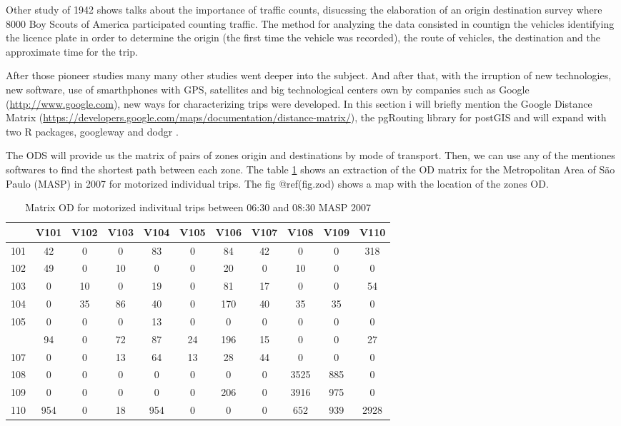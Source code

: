 \documentclass[12pt,graybox,envcountchap,sectrefs]{krantz}
\theoremstyle{definition}
\theoremstyle{definition}
\theoremstyle{definition}
\theoremstyle{remark}
\begin{document}
Other study of 1942 shows talks about the importance of traffic counts,
disucssing the elaboration of an origin destination survey where 8000
Boy Scouts of America participated counting traffic. The method for
analyzing the data consisted in countign the vehicles identifying the
licence plate in order to determine the origin (the first time the
vehicle was recorded), the route of vehicles, the destination and the
approximate time for the trip.

After those pioneer studies many many other studies went deeper into the
subject. And after that, with the irruption of new technologies, new
software, use of smarthphones with GPS, satellites and big technological
centers own by companies such as Google (\url{http://www.google.com}),
new ways for characterizing trips were developed. In this section i will
briefly mention the Google Distance Matrix
(\url{https://developers.google.com/maps/documentation/distance-matrix/}),
the pgRouting library \citep{patrushev2007shortest} for postGIS and will
expand with two R packages, googleway \citep{googleway} and dodgr
\citep{dodgr}.

The ODS will provide us the matrix of pairs of zones origin and
destinations by mode of transport. Then, we can use any of the mentiones
softwares to find the shortest path between each zone. The table
\ref{tab:ods} shows an extraction of the OD matrix for the Metropolitan
Area of São Paulo (MASP) in 2007 for motorized individual trips. The fig
@ref(fig.zod) shows a map with the location of the zones OD.

\begin{table}

\caption{\label{tab:ods}Matrix OD for motorized indivitual trips between 06:30 and 08:30 MASP 2007}
\centering
\begin{tabular}[t]{lcccccccccc}
\toprule
  & V101 & V102 & V103 & V104 & V105 & V106 & V107 & V108 & V109 & V110\\
\midrule
101 & 42 & 0 & 0 & 83 & 0 & 84 & 42 & 0 & 0 & 318\\
102 & 49 & 0 & 10 & 0 & 0 & 20 & 0 & 10 & 0 & 0\\
103 & 0 & 10 & 0 & 19 & 0 & 81 & 17 & 0 & 0 & 54\\
104 & 0 & 35 & 86 & 40 & 0 & 170 & 40 & 35 & 35 & 0\\
105 & 0 & 0 & 0 & 13 & 0 & 0 & 0 & 0 & 0 & 0\\
\addlinespace
106 & 94 & 0 & 72 & 87 & 24 & 196 & 15 & 0 & 0 & 27\\
107 & 0 & 0 & 13 & 64 & 13 & 28 & 44 & 0 & 0 & 0\\
108 & 0 & 0 & 0 & 0 & 0 & 0 & 0 & 3525 & 885 & 0\\
109 & 0 & 0 & 0 & 0 & 0 & 206 & 0 & 3916 & 975 & 0\\
110 & 954 & 0 & 18 & 954 & 0 & 0 & 0 & 652 & 939 & 2928\\
\bottomrule
\end{tabular}
\end{table}
\end{document}
